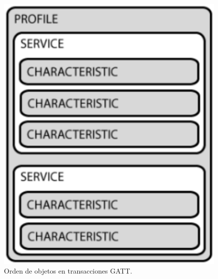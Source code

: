 \begin{figure}[H]
	\centering
	\includegraphics[scale=0.4]{figuras/rn4020/orden_gatt.png}
	\caption{Orden de objetos en transacciones GATT.}
	\label{orden_gatt}
\end{figure}

